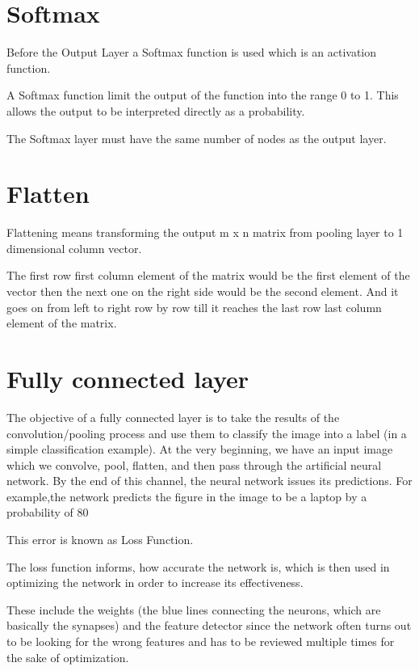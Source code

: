 \documentclass[a4paper,13pt,twoside]{book}
\begin{document}
\section{Softmax}

Before the Output Layer a Softmax function is used which is an activation function.

A Softmax function limit the output of the function into the range  0 to 1. This allows the output to be interpreted directly as a probability.

The Softmax layer must have the same number of nodes as the output layer.

\section{Flatten}

Flattening means transforming the output m x n matrix from pooling layer to 1 dimensional column vector.

The first row first column element of the matrix would be the first element of the vector then the next one on the right side would be the second element. And it goes on from left to right row by row till it reaches the last row last column element of the matrix.

\section{Fully connected layer}

The objective of a fully connected layer is to take the results of the convolution/pooling process and use them to classify the image into a label (in a simple classification example).
At the very beginning, we have an input image which we convolve, pool, flatten, and then pass through the artificial neural network.
By the end of this channel, the neural network issues its predictions. For example,the network predicts the figure in the image to be a laptop by a probability of 80%

This error is known as Loss Function.

The loss function informs, how accurate the network is, which is then used in optimizing the network in order to increase its effectiveness.

These include the weights (the blue lines connecting the neurons, which are basically the synapses) and the feature detector since the network often turns out to be looking for the wrong features and has to be reviewed multiple times for the sake of optimization.
\end{document}

